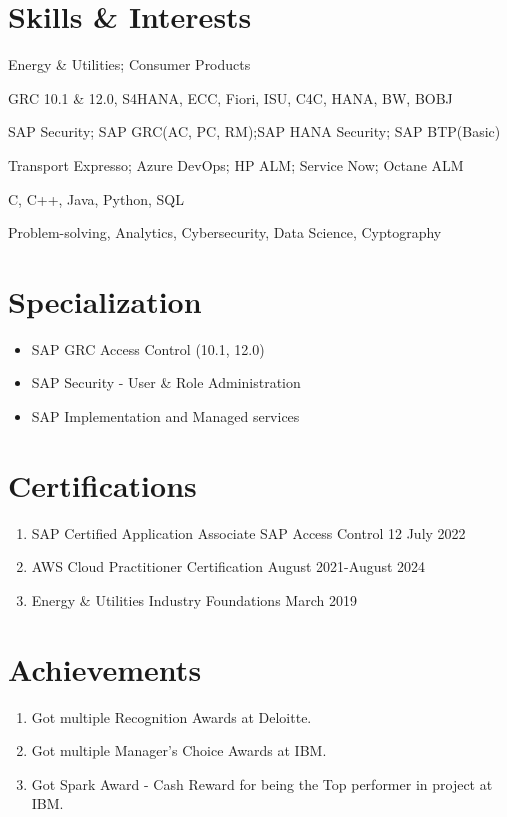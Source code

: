 \documentclass[10pt]{article}
\begin{document}
\section{Skills \& Interests}
\begin{description}[itemsep=0pt]
	\small
		\item[Industry Served:] Energy \& Utilities; Consumer Products
		\item[SAP Applications:] GRC 10.1 \& 12.0, S4HANA, ECC, Fiori, ISU, C4C, HANA, BW, BOBJ
		\item[Trainings:] SAP Security; SAP GRC(AC, PC, RM);SAP HANA Security; SAP BTP(Basic)
		\item[Tools used:] Transport Expresso; Azure DevOps; HP ALM; Service Now; Octane ALM
		\item[Language:] C, C++, Java, Python, SQL
		\item[Interests:] Problem-solving, Analytics, Cybersecurity, Data Science, Cyptography
\end{description}

\section{Specialization}
\begin{itemize}
	\small
		\item SAP GRC Access Control (10.1, 12.0)
		\item SAP Security - User \& Role Administration
		\item SAP Implementation and Managed services
\end{itemize}

\section{Certifications}
\begin{enumerate}[label=\null, left=0pt..0pt, itemsep=0pt]
	\small
		\item SAP Certified Application Associate SAP Access Control 12 \hfill July 2022
		\item AWS Cloud Practitioner Certification \hfill August 2021-August 2024
		\item Energy \& Utilities Industry Foundations \hfill March 2019
\end{enumerate}

\section{Achievements}
\begin{enumerate}[label=\null, left=0pt..0pt, itemsep=0pt]
	\small
		\item Got multiple Recognition Awards at Deloitte.
		\item Got multiple Manager's Choice Awards at IBM.
		\item Got Spark Award - Cash Reward for being the Top performer in project at IBM.
\end{enumerate}
\end{document}
